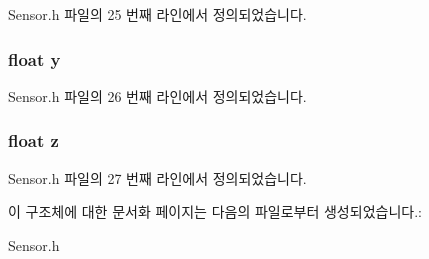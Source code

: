 Sensor.\-h 파일의 25 번째 라인에서 정의되었습니다.

\hypertarget{struct__3d__data_aa4f0d3eebc3c443f9be81bf48561a217}{
\subsubsection[{y}]{\setlength{\rightskip}{0pt plus 5cm}float y}}\label{struct__3d__data_aa4f0d3eebc3c443f9be81bf48561a217}


Sensor.\-h 파일의 26 번째 라인에서 정의되었습니다.

\hypertarget{struct__3d__data_af73583b1e980b0aa03f9884812e9fd4d}{
\subsubsection[{z}]{\setlength{\rightskip}{0pt plus 5cm}float z}}\label{struct__3d__data_af73583b1e980b0aa03f9884812e9fd4d}


Sensor.\-h 파일의 27 번째 라인에서 정의되었습니다.



이 구조체에 대한 문서화 페이지는 다음의 파일로부터 생성되었습니다.\-:\begin{DoxyCompactItemize}
\item 
Sensor.\-h\end{DoxyCompactItemize}
